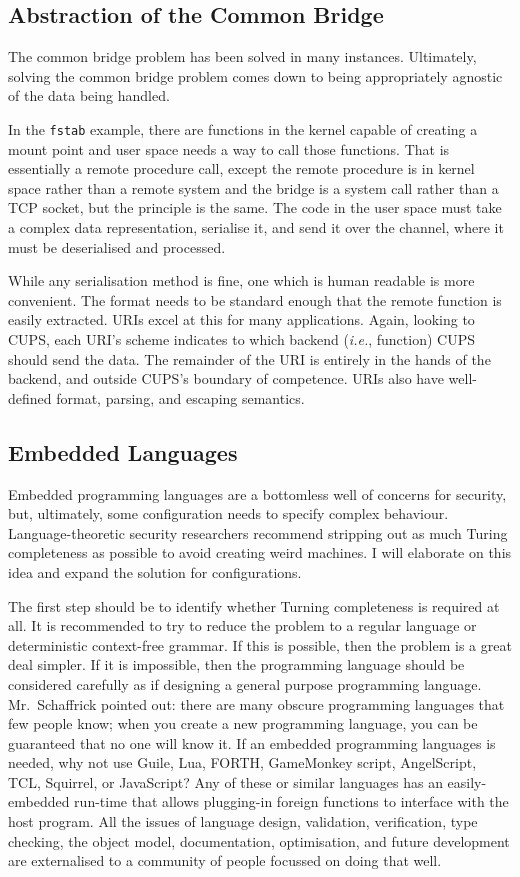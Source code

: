 \documentclass[letterpaper,twocolumn,10pt]{article}
\begin{document}
\subsection{Abstraction of the Common Bridge}
The common bridge problem has been solved in many instances. Ultimately, solving the common bridge problem comes down to being appropriately agnostic of the data being handled.

In the \texttt{fstab} example, there are functions in the kernel capable of creating a mount point and user space needs a way to call those functions. That is essentially a remote procedure call, except the remote procedure is in kernel space rather than a remote system and the bridge is a system call rather than a TCP socket, but the principle is the same. The code in the user space must take a complex data representation, serialise it, and send it over the channel, where it must be deserialised and processed.

While any serialisation method is fine, one which is human readable is more convenient. The format needs to be standard enough that the remote function is easily extracted. URIs excel at this for many applications. Again, looking to CUPS, each URI's scheme indicates to which backend (\emph{i.e.}, function) CUPS should send the data. The remainder of the URI is entirely in the hands of the backend, and outside CUPS's boundary of competence. URIs also have well-defined format, parsing, and escaping semantics.

\subsection{Embedded Languages}
Embedded programming languages are a bottomless well of concerns for security, but, ultimately, some configuration needs to specify complex behaviour. Language-theoretic security researchers recommend stripping out as much Turing completeness as possible to avoid creating weird machines. I will elaborate on this idea and expand the solution for configurations.

The first step should be to identify whether Turning completeness is required at all. It is recommended to try to reduce the problem to a regular language or deterministic context-free grammar. If this is possible, then the problem is a great deal simpler. If it is impossible, then the programming language should be considered carefully as if designing a general purpose programming language. Mr.~Schaffrick pointed out: there are many obscure programming languages that few people know; when you create a new programming language, you can be guaranteed that no one will know it. If an embedded programming languages is needed, why not use Guile, Lua, FORTH, GameMonkey script, AngelScript, TCL, Squirrel, or JavaScript? Any of these or similar languages has an easily-embedded run-time that allows plugging-in foreign functions to interface with the host program. All the issues of language design, validation, verification, type checking, the object model, documentation, optimisation, and future development are externalised to a community of people focussed on doing that well.
\end{document}
